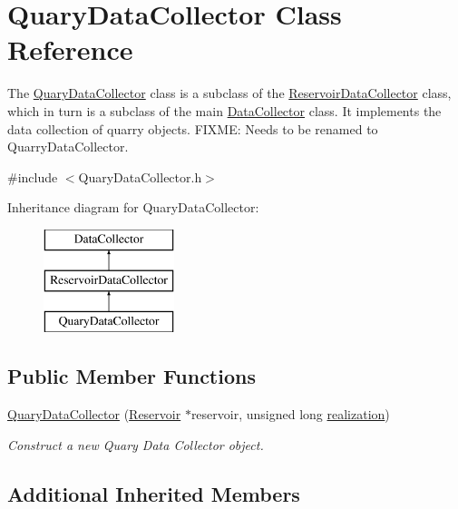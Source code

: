\hypertarget{classQuaryDataCollector}{}\section{Quary\+Data\+Collector Class Reference}
\label{classQuaryDataCollector}


The {\ttfamily \mbox{\hyperlink{classQuaryDataCollector}{Quary\+Data\+Collector}}} class is a subclass of the {\ttfamily \mbox{\hyperlink{classReservoirDataCollector}{Reservoir\+Data\+Collector}}} class, which in turn is a subclass of the main {\ttfamily \mbox{\hyperlink{classDataCollector}{Data\+Collector}}} class. It implements the data collection of quarry objects. F\+I\+X\+ME\+: Needs to be renamed to {\ttfamily Quarry\+Data\+Collector}.  




{\ttfamily \#include $<$Quary\+Data\+Collector.\+h$>$}

Inheritance diagram for Quary\+Data\+Collector\+:\begin{figure}[H]
\begin{center}
\leavevmode
\includegraphics[height=3.000000cm]{classQuaryDataCollector}
\end{center}
\end{figure}
\subsection*{Public Member Functions}
\begin{DoxyCompactItemize}
\item 
\mbox{\hyperlink{classQuaryDataCollector_af2f534feeca2a37104309a595d064cbd}{Quary\+Data\+Collector}} (\mbox{\hyperlink{classReservoir}{Reservoir}} $\ast$reservoir, unsigned long \mbox{\hyperlink{classDataCollector_a9ef2887466fe3123aa19ef956a219b96}{realization}})
\begin{DoxyCompactList}\small\item\em Construct a new Quary Data Collector object. \end{DoxyCompactList}\end{DoxyCompactItemize}
\subsection*{Additional Inherited Members}


